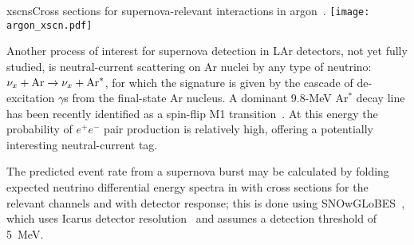 \begin{cdrfigure}{xscns}{Cross sections for supernova-relevant interactions in argon~\cite{GilBotella:2003sz,snowglobes}.}
\texttt{[image: argon\_xscn.pdf]}
\end{cdrfigure}

Another process of interest for supernova detection in LAr detectors, not yet fully studied,  is neutral-current  scattering on Ar nuclei by any type of neutrino: $\nu_x + {\rm Ar} \rightarrow \nu_x + {\rm Ar}^*$,  for which the signature is given by the cascade of de-excitation $\gamma$s from the final-state Ar nucleus. A dominant 9.8-MeV Ar$^*$ decay line has been recently identified as a spin-flip M1 transition~\cite{Hayes}.   At this energy the probability of $e^+e^-$ pair production is relatively high, offering a potentially interesting neutral-current tag.


 The predicted event rate from a supernova burst may be calculated by
folding expected neutrino differential energy spectra in with cross
sections for the relevant channels and with detector response; this is done using SNOwGLoBES~\cite{snowglobes}, which uses Icarus detector resolution~\cite{Amoruso:2003sw} and assumes a detection threshold of 5~MeV.

